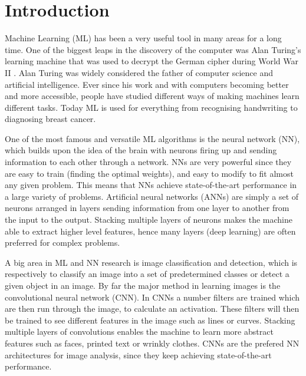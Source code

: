 \section{Introduction}

Machine Learning (ML) has been a very useful tool in many areas for a long time. One of the biggest leaps in the discovery of the computer was Alan Turing's learning machine that was used to decrypt the German cipher during World War II \cite{turing}. Alan Turing was widely considered the father of computer science and artificial intelligence\cite{Beavers2013}. Ever since his work and with computers becoming better and more accessible, people have studied different ways of making machines learn different tasks. Today ML is used for everything from recognising handwriting to diagnosing breast cancer\cite{Khuriwal2018}. 

One of the most famous and versatile ML algorithms is the neural network (NN), which builds upon the idea of the brain with neurons firing up and sending information to each other through a network. NNs are very powerful since they are easy to train (finding the optimal weights), and easy to modify to fit almost any given problem. This means that NNs achieve state-of-the-art performance in a large variety of problems. Artificial neural networks (ANNs) are simply a set of neurons arranged in layers sending information from one layer to another from the input to the output. Stacking multiple layers of neurons makes the machine able to extract higher level features\cite{deepLearning}, hence many layers (deep learning) are often preferred for complex problems.

A big area in ML and NN research is image classification and detection, which is respectively to classify an image into a set of predetermined classes or detect a given object in an image. By far the major method in learning images is the convolutional neural network (CNN). In CNNs a number filters are trained which are then run through the image, to calculate an activation. These filters will then be trained to see different features in the image such as lines or curves. Stacking multiple layers of convolutions enables the machine to learn more abstract features such as faces, printed text or wrinkly clothes\cite{Yosinski2015}. CNNs are the prefered NN architectures for image analysis, since they keep achieving state-of-the-art performance.

